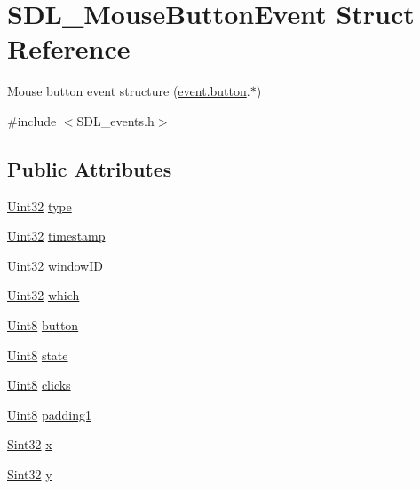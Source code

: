 \hypertarget{struct_s_d_l___mouse_button_event}{\section{S\-D\-L\-\_\-\-Mouse\-Button\-Event Struct Reference}
\label{struct_s_d_l___mouse_button_event}
}


Mouse button event structure (\hyperlink{union_s_d_l___event_ab6da2fa2687e5f849f270adecc64785f}{event.\-button}.$\ast$)  




{\ttfamily \#include $<$S\-D\-L\-\_\-events.\-h$>$}

\subsection*{Public Attributes}
\begin{DoxyCompactItemize}
\item 
\hyperlink{_s_d_l__stdinc_8h_add440eff171ea5f55cb00c4a9ab8672d}{Uint32} \hyperlink{struct_s_d_l___mouse_button_event_af64cb09ea68b8081ecc8ee498552e3d7}{type}
\item 
\hyperlink{_s_d_l__stdinc_8h_add440eff171ea5f55cb00c4a9ab8672d}{Uint32} \hyperlink{struct_s_d_l___mouse_button_event_ab05e8a454692608ff56c502e95799c56}{timestamp}
\item 
\hyperlink{_s_d_l__stdinc_8h_add440eff171ea5f55cb00c4a9ab8672d}{Uint32} \hyperlink{struct_s_d_l___mouse_button_event_ab3b855d4b543b5d02fcf5d56e4421393}{window\-I\-D}
\item 
\hyperlink{_s_d_l__stdinc_8h_add440eff171ea5f55cb00c4a9ab8672d}{Uint32} \hyperlink{struct_s_d_l___mouse_button_event_a366aef59a0f393afc8a3561e741825df}{which}
\item 
\hyperlink{_s_d_l__stdinc_8h_a2944638813a090aa23e62f4da842c3e2}{Uint8} \hyperlink{struct_s_d_l___mouse_button_event_a1a4680e19ae06d02d2093f0bcba1b24c}{button}
\item 
\hyperlink{_s_d_l__stdinc_8h_a2944638813a090aa23e62f4da842c3e2}{Uint8} \hyperlink{struct_s_d_l___mouse_button_event_a8809cef85cfffad4f2059f2ba4fc6a3d}{state}
\item 
\hyperlink{_s_d_l__stdinc_8h_a2944638813a090aa23e62f4da842c3e2}{Uint8} \hyperlink{struct_s_d_l___mouse_button_event_aa606bebcbc3ffc7e932016039c2a36a1}{clicks}
\item 
\hyperlink{_s_d_l__stdinc_8h_a2944638813a090aa23e62f4da842c3e2}{Uint8} \hyperlink{struct_s_d_l___mouse_button_event_a765957d218d16fa00558fa4d20e80689}{padding1}
\item 
\hyperlink{_s_d_l__stdinc_8h_a7a90b941db9d4582e9ad7abb9940ff7e}{Sint32} \hyperlink{struct_s_d_l___mouse_button_event_a5bb9c61b86e999f58637511e32e3a076}{x}
\item 
\hyperlink{_s_d_l__stdinc_8h_a7a90b941db9d4582e9ad7abb9940ff7e}{Sint32} \hyperlink{struct_s_d_l___mouse_button_event_a7ccb5c55a7ddadce723f4ea6d5269540}{y}
\end{DoxyCompactItemize}


